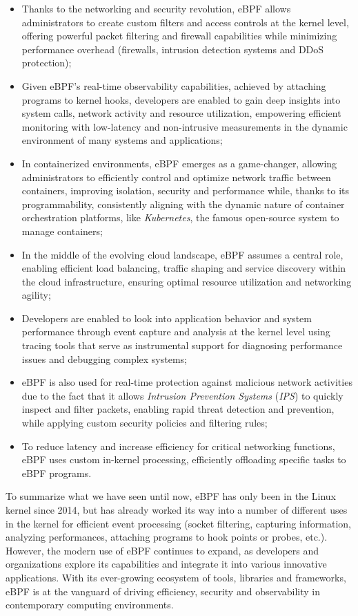 \begin{itemize}
	\item 
		Thanks to the networking and security revolution, eBPF allows administrators to create custom filters and access controls at the kernel level, offering powerful packet filtering and firewall capabilities while minimizing performance overhead (firewalls, intrusion detection systems and DDoS protection);
	\item 
		Given eBPF's real-time observability capabilities, achieved by attaching programs to kernel hooks, developers are enabled to gain deep insights into system calls, network activity and resource utilization, empowering efficient monitoring with low-latency and non-intrusive measurements in the dynamic environment of many systems and applications;
	\item 
		In containerized environments, eBPF emerges as a game-changer, allowing administrators to efficiently control and optimize network traffic between containers, improving isolation, security and performance while, thanks to its programmability, consistently aligning with the dynamic nature of container orchestration platforms, like \textit{Kubernetes}, the famous open-source system to manage containers;
	\item 
		In the middle of the evolving cloud landscape, eBPF assumes a central role, enabling efficient load balancing, traffic shaping and service discovery within the cloud infrastructure, ensuring optimal resource utilization and networking agility;
	\item 
		Developers are enabled to look into application behavior and system performance through event capture and analysis at the kernel level using tracing tools that serve as instrumental support for diagnosing	performance issues and debugging complex systems;
	\item 
		eBPF is also used for real-time protection against malicious network activities due to the fact that it allows \textit{Intrusion Prevention Systems} (\textit{IPS}) to quickly inspect and filter packets, enabling rapid threat detection and prevention, while applying custom security policies and filtering rules;
	\item 
		To reduce latency and increase efficiency for critical networking functions, eBPF uses custom in-kernel processing, efficiently offloading specific tasks to eBPF programs.
\end{itemize}

To summarize what we have seen until now, eBPF has only been in the Linux kernel since 2014, but has already worked its way into a number of different uses in the kernel for efficient event processing (socket filtering, capturing information, analyzing performances, attaching programs to hook points or probes, etc.). 
However, the modern use of eBPF continues to expand, as developers and organizations explore its capabilities and integrate it into various innovative applications. 
With its ever-growing ecosystem of tools, libraries and frameworks, eBPF is at the vanguard of driving efficiency, security and observability in contemporary computing environments.


